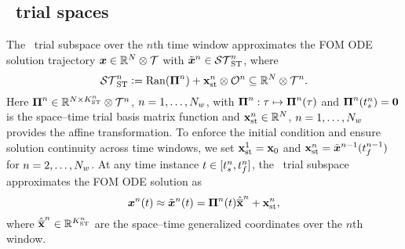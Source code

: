 \subsection{\spaceTimeAcronym\ trial spaces}\label{sec:wls_spacetime}

The \spaceTimeAcronym\ trial subspace over the $n$th time window approximates
the FOM ODE solution trajectory ${\boldsymbol x}\in\mathbb{R}^{N}\otimes\mathcal{T}$
with $\tilde{\boldsymbol x}^{n} \in \mathcal{ ST }_{\text{ST}}^{n}$, where
\begin{equation}\label{eq:st_sttrialspace}
 \mathcal{ ST }_{\text{ST}}^{n} \vcentcolon=
 \mathrm{Ran}(\boldsymbol \Pi^{n}) + \mathbf{x}_\text{st}^{n}\otimes \mathcal{O}^{n} \subseteq \mathbb{R}^{N} \otimes \mathcal{T}^{n}.
\end{equation}
Here $\boldsymbol \Pi^{n} \in \mathbb{R}^{N \times
K_{\text{ST}}^{n}}\otimes\mathcal{T}^{n}$, $n=1,\ldots,N_w$, with $\boldsymbol \Pi^{n}: \tau \mapsto \boldsymbol \Pi^{n}(\tau)$ and $\boldsymbol \Pi^{n}(t_s^{n}) = \boldsymbol 0$ is the space--time trial basis matrix {function} and $\mathbf{x}_\text{st}^{n} \in \mathbb{R}^{N}$, $n=1,\ldots,N_w$ provides the affine transformation. 
To enforce the initial condition and ensure solution continuity across time windows, we set $\mathbf{x}_\text{st}^{1} = {{\mathbf{x}}_0}$ and
$\mathbf{x}_\text{st}^{n} = \tilde{\boldsymbol x}^{n-1}(t_f^{n-1})$ for
$n=2,\ldots,N_w$.
At any time instance $t \in [t_s^{n},t_f^{n}]$, the \spaceTimeAcronym\ trial subspace approximates the FOM ODE solution as
 \begin{equation}\label{eq:stapprox}
 {\boldsymbol x}^{n}(t) \approx \tilde{\boldsymbol x}^{n}(t)  = \boldsymbol \Pi^{n}(t) \hat{\mathbf{\overline{x}}}^{n} + \mathbf{x}_\text{st}^{n},
\end{equation}
where $\hat{\mathbf{\overline{x}}}^{n} \in \mathbb{R}^{K_{\text{ST}}^{n}}$ are the space--time generalized coordinates over the $n$th window. 
